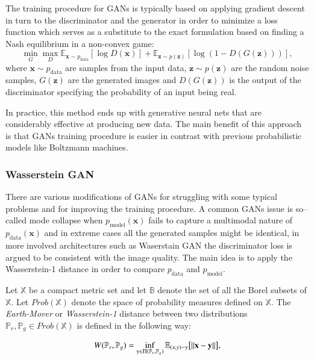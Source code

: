 \documentclass{webofc}
\begin{document}
The training procedure for GANs is typically based on applying gradient descent in turn to the discriminator and the generator in order to minimize a loss function which serves as a substitute to the exact formulation based on finding a Nash equilibrium in a non-convex game:
\begin{equation}\label{eq1}
\min_G \max_D \mathbb{E}_{\textbf{x} \sim p_{\text{data}}} [\log D(\textbf{x})] + \mathbb{E}_{\textbf{z} \sim p(\textbf{z})} [\log(1 - D(G(\textbf{z})))],
\end{equation}
where $\textbf{x} \sim p_{\text{data}}$ are samples from the input data, $\textbf{z} \sim p(\textbf{z})$ are the random noise samples, $G(\textbf{z})$ are the generated images and $D(G(\textbf{z}))$ is the output of the discriminator specifying the probability of an input being real.

In practice, this method ends up with generative neural nets that are considerably effective at producing new data. The main benefit of this approach is that GANs training procedure is easier in contrast with previous probabilistic models like Boltzmann machines.

\subsubsection{Wasserstein GAN}
There are various modifications of GANs for struggling with some typical problems and for improving the training procedure. A common GANs issue is so--called mode collapse when $p_\text{model} (\textbf{x})$ fails to capture a multimodal nature of $p_{\text{data}}(\textbf{x})$ and in extreme cases all the generated samples might be identical, in more involved architectures such as Waserstain GAN \cite{arjovsky2017wasserstein} the discriminator loss is argued to be consistent with the image quality. The main idea is to apply the Wasserstein-1 distance in order to compare $p_{\text{data}}$ and $p_{\text{model}}$.

Let $\mathbb{X}$ be a compact metric set and let $\mathbb{B}$ denote the set of all the Borel subsets of $\mathbb{X}$. Let $Prob(\mathbb{X})$ denote the space of probability measures defined on $\mathbb{X}$. The \emph{Earth-Mover} or \emph{Wasserstein-1} distance between two distributions $\mathbb{P}_r, \mathbb{P}_g \in Prob(\mathbb{X})$ is defined in the following way:

\begin{equation}\label{wasserstein_metric}
W(\mathbb{P}_r, \mathbb{P}_g) = \inf_{\gamma \in \Pi(\mathbb{P}_r, \mathbb{P}_g)} \mathbb{E}_{(x, y) \sim \gamma} \big{[}\|\textbf{x}-\textbf{y}\|\big{]},
\end{equation}
\end{document}
